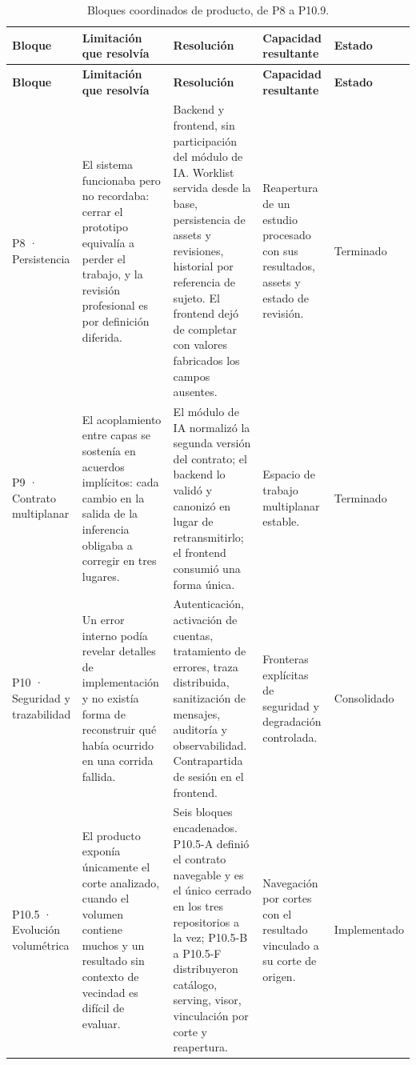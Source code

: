 \begin{longtable}{|>{\raggedright\arraybackslash}p{}|>{\raggedright\arraybackslash}p{}|>{\raggedright\arraybackslash}p{}|>{\raggedright\arraybackslash}p{}|>{\raggedright\arraybackslash}p{}|}
\caption{Bloques coordinados de producto, de P8 a P10.9.}
\label{tab:anexo-f-bloques-coordinados}\\
\hline
\textbf{Bloque} & \textbf{Limitación que resolvía} & \textbf{Resolución} & \textbf{Capacidad resultante} & \textbf{Estado} \\
\hline
\endfirsthead
\hline
\textbf{Bloque} & \textbf{Limitación que resolvía} & \textbf{Resolución} & \textbf{Capacidad resultante} & \textbf{Estado} \\
\hline
\endhead
P8 · Persistencia & El sistema funcionaba pero no recordaba: cerrar el prototipo equivalía a perder el trabajo, y la revisión profesional es por definición diferida. & Backend y frontend, sin participación del módulo de IA. Worklist servida desde la base, persistencia de assets y revisiones, historial por referencia de sujeto. El frontend dejó de completar con valores fabricados los campos ausentes. & Reapertura de un estudio procesado con sus resultados, assets y estado de revisión. & Terminado \\
\hline
P9 · Contrato multiplanar & El acoplamiento entre capas se sostenía en acuerdos implícitos: cada cambio en la salida de la inferencia obligaba a corregir en tres lugares. & El módulo de IA normalizó la segunda versión del contrato; el backend lo validó y canonizó en lugar de retransmitirlo; el frontend consumió una forma única. & Espacio de trabajo multiplanar estable. & Terminado \\
\hline
P10 · Seguridad y trazabilidad & Un error interno podía revelar detalles de implementación y no existía forma de reconstruir qué había ocurrido en una corrida fallida. & Autenticación, activación de cuentas, tratamiento de errores, traza distribuida, sanitización de mensajes, auditoría y observabilidad. Contrapartida de sesión en el frontend. & Fronteras explícitas de seguridad y degradación controlada. & Consolidado \\
\hline
P10.5 · Evolución volumétrica & El producto exponía únicamente el corte analizado, cuando el volumen contiene muchos y un resultado sin contexto de vecindad es difícil de evaluar. & Seis bloques encadenados. P10.5-A definió el contrato navegable y es el único cerrado en los tres repositorios a la vez; P10.5-B a P10.5-F distribuyeron catálogo, serving, visor, vinculación por corte y reapertura. & Navegación por cortes con el resultado vinculado a su corte de origen. & Implementado \\

\end{longtable}
